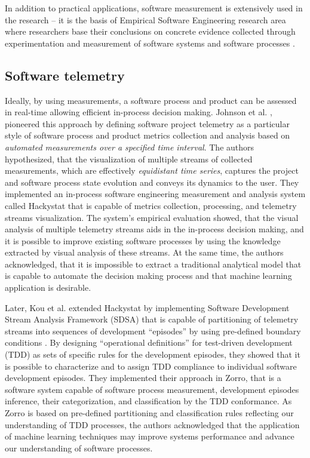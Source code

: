 In addition to practical applications, software measurement is extensively used in the research --
it is the basis of Empirical Software Engineering research area where researchers base their conclusions on 
concrete evidence collected through experimentation and measurement of software systems and software 
processes \cite{citeulike:766768}.

\subsection{Software telemetry}\label{section_software_telemetry}
Ideally, by using measurements, a software process and product can be assessed in real-time allowing efficient 
in-process decision making.
Johnson et al. \cite{citeulike:557296}, pioneered this approach by defining software project telemetry as a 
particular style of software process and product metrics collection and analysis based on 
\textit{automated measurements over a specified time interval}. 
The authors hypothesized, that the visualization of multiple streams of collected measurements, 
which are effectively \textit{equidistant time series}, captures the project and software 
process state evolution and conveys its dynamics to the user.
They implemented an in-process software engineering measurement and analysis system called Hackystat 
\cite{citeulike:12929227} that is capable of metrics collection, processing, and telemetry streams visualization. 
The system's empirical evaluation showed, that the visual analysis of multiple telemetry streams aids 
in the in-process decision making, and it is possible to improve existing software processes by using 
the knowledge extracted by visual analysis of these streams. 
At the same time, the authors acknowledged, that it is impossible to extract a traditional analytical 
model that is capable to automate the decision making process and that machine learning application is 
desirable.

Later, Kou et al. extended Hackystat by implementing Software Development Stream Analysis Framework (SDSA) 
that is capable of partitioning of telemetry streams into sequences of development ``episodes'' by using 
pre-defined boundary conditions \cite{citeulike:6180831} \cite{citeulike:11538873}.
By designing ``operational definitions'' for test-driven development (TDD) as sets of specific rules for 
the development episodes, they showed that it is possible to characterize and to assign TDD compliance to 
individual software development episodes.
They implemented their approach in Zorro, that is a software system capable of software process measurement, 
development episodes inference, their categorization, and classification by the TDD conformance. 
As Zorro is based on pre-defined partitioning and classification rules reflecting our understanding of 
TDD processes, the authors acknowledged that the application of machine learning techniques may improve 
systems performance and advance our understanding of software processes.

